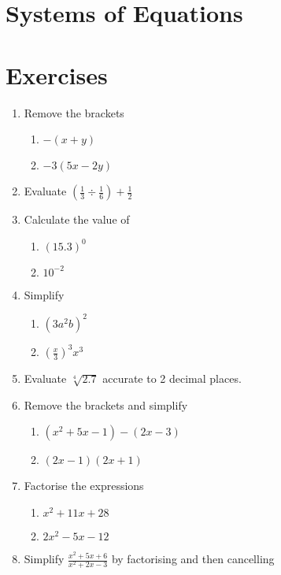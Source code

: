 \section{Systems of Equations}
 
 
\section{Exercises} 
 
\begin{enumerate}
	\item Remove the brackets 
	\begin{enumerate}
		\item $ -\left (x +y\right )$ 
		\item $ -3 (5 x -2 y)$ \end{enumerate}
	
	\item Evaluate $\left (\frac{1}{3} \div \frac{1}{6}\right ) +\frac{1}{2}$ 
	
	\item Calculate the value of 
	\begin{enumerate}
		\item $\left (15.3\right )^{0}$ 
		\item $10^{ -2}$ \end{enumerate}
	\item Simplify 
	\begin{enumerate}
		\item $\left (3 a^{2} b\right )^{2}$ 
		
		\item $\genfrac{(}{)}{}{}{x}{3}^{3} x^{3}$ \end{enumerate}
	
	
	\item Evaluate $\sqrt[{4}]{2.7}$ accurate to 2 decimal places. 
	
	\item Remove the brackets and simplify 
	
	
	\begin{enumerate}
		\item $\left (x^{2} +5 x -1\right ) -\left (2 x -3\right )$ 
		
		\item $\left (2 x -1\right ) \left (2 x +1\right )$ \end{enumerate}
	
	
	\item Factorise the expressions 
	\begin{enumerate}
		\item $x^{2} +11 x +28$ 	
		\item $2 x^{2} -5 x -12$ 
		\end{enumerate}
	\item Simplify $\frac{x^{2} +5 x +6}{x^{2} +2 x -3}$ by factorising and then cancelling 
	

\end{enumerate}
